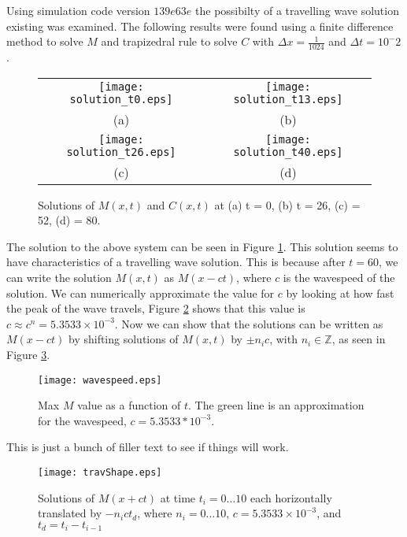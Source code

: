 Using simulation code version $139e63e$ the possibilty of a travelling wave solution existing was examined. The following results were found using a finite difference method to solve $M$ and trapizedral rule to solve $C$ with $\Delta x = \frac{1}{1024}$ and $\Delta t = 10^-2$.



\begin{figure}[h!tb]
\begin{center}
  \begin{tabular}{c c}
      \texttt{[image: solution\_t0.eps]} &
      \texttt{[image: solution\_t13.eps]} \\
      (a) & (b) \\
      \texttt{[image: solution\_t26.eps]} &
      \texttt{[image: solution\_t40.eps]} \\
      (c) & (d) 
  \end{tabular}
  \caption{Solutions of $M(x,t)$ and $C(x,t)$ at (a) t = 0, (b) t = 26, (c) = 52, (d) = 80. }
  \label{fig:solution}
\end{center}
\end{figure}

The solution to the above system can be seen in Figure \ref{fig:solution}. This solution seems to have characteristics of a travelling wave solution. This is because after $t=60$, we can write the solution $M(x,t)$ as $M(x-ct)$, where $c$ is the wavespeed of the solution. We can numerically approximate the value for $c$ by looking at how fast the peak of the wave travels, Figure \ref{fig:waveSpeed} shows that this value is $c \approx c^n = 5.3533 \times 10^{-3}$. Now we can show that the solutions can be written as $M(x-ct)$ by shifting solutions of $M(x,t)$ by $\pm n_i c$, with $n_i \in \mathbb{Z}$, as seen in Figure \ref{fig:travShape}.

\begin{figure}[h!tb]
\begin{center}
    \texttt{[image: wavespeed.eps]}
    \caption{Max $M$ value as a function of $t$. The green line is an approximation for the wavespeed, $c = 5.3533 * 10^{-3}$.}
    \label{fig:waveSpeed} 
\end{center}
\end{figure}

This is just a bunch of filler text to see if things will work.

\begin{figure}[h!tb]
\begin{center}
    \texttt{[image: travShape.eps]}
    \caption{Solutions of $M(x+ct)$ at time $t_i = 0 \ldots 10$ each horizontally translated by $-n_i c t_d$, where $n_i = 0 \ldots 10$,  $c = 5.3533 \times 10^{-3}$, and $t_d = t_i - t_{i-1} $}
    \label{fig:travShape}
\end{center}
\end{figure}


